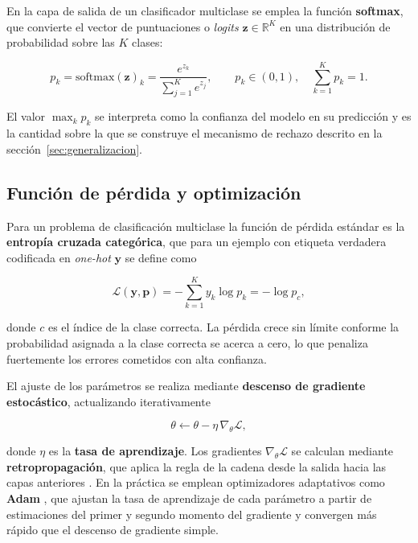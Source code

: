 En la capa de salida de un clasificador multiclase se emplea la función
\textbf{softmax}, que convierte el vector de puntuaciones o \textit{logits}
$\mathbf{z} \in \mathbb{R}^{K}$ en una distribución de probabilidad sobre
las $K$ clases:

\begin{equation}
p_{k} = \mathrm{softmax}(\mathbf{z})_{k} = \frac{e^{z_{k}}}{\sum_{j=1}^{K} e^{z_{j}}},
\qquad p_{k} \in (0,1), \quad \sum_{k=1}^{K} p_{k} = 1.
\label{eq:softmax}
\end{equation}

El valor $\max_{k} p_{k}$ se interpreta como la confianza del modelo en su
predicción y es la cantidad sobre la que se construye el mecanismo de
rechazo descrito en la sección~\ref{sec:generalizacion}.

\subsection{Función de pérdida y optimización}

Para un problema de clasificación multiclase la función de pérdida estándar
es la \textbf{entropía cruzada categórica}, que para un ejemplo con
etiqueta verdadera codificada en \textit{one-hot} $\mathbf{y}$ se define
como

\begin{equation}
\mathcal{L}(\mathbf{y}, \mathbf{p}) = -\sum_{k=1}^{K} y_{k} \log p_{k} = -\log p_{c},
\label{eq:crossentropy}
\end{equation}

\noindent donde $c$ es el índice de la clase correcta. La pérdida crece sin
límite conforme la probabilidad asignada a la clase correcta se acerca a
cero, lo que penaliza fuertemente los errores cometidos con alta confianza.

El ajuste de los parámetros se realiza mediante \textbf{descenso de
gradiente estocástico}, actualizando iterativamente

\begin{equation}
\theta \leftarrow \theta - \eta \, \nabla_{\theta} \mathcal{L},
\label{eq:sgd}
\end{equation}

\noindent donde $\eta$ es la \textbf{tasa de aprendizaje}. Los gradientes
$\nabla_{\theta}\mathcal{L}$ se calculan mediante
\textbf{retropropagación}, que aplica la regla de la cadena desde la salida
hacia las capas anteriores \citep{rumelhart1986}. En la práctica se emplean
optimizadores adaptativos como \textbf{Adam} \citep{kingma2015}, que ajustan
la tasa de aprendizaje de cada parámetro a partir de estimaciones del primer
y segundo momento del gradiente y convergen más rápido que el descenso de
gradiente simple.

